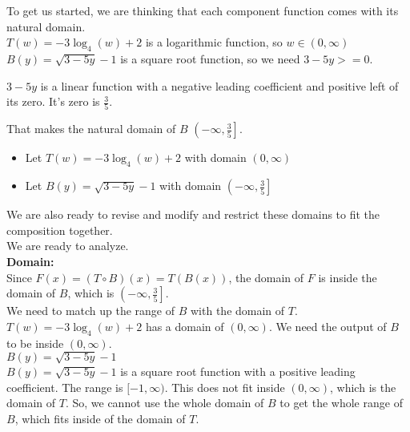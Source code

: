\documentclass{ximera}
\begin{document}
To get us started, we are thinking that each component function comes with its natural domain. \\


$T(w) = -3 \log_4(w) + 2$ is a logarithmic function, so $w \in (0, \infty)$ \\


$B(y) = \sqrt{3 - 5y} - 1$ is a square root function, so we need $3 - 5y >= 0$.

$3 - 5y$ is a linear function with a negative leading coefficient and positive left of its zero.  It's zero is $\frac{3}{5}$.

That makes the natural domain of $B$ $\left(-\infty, \frac{3}{5} \right]$. \\



\begin{itemize}
\item Let $T(w) = -3 \log_4(w) + 2$ with domain $(0, \infty)$\\
\item Let $B(y) = \sqrt{3 - 5y} - 1$ with domain $\left(-\infty, \frac{3}{5} \right]$\\
\end{itemize}

We are also ready to revise and modify and restrict these domains to fit the composition together. \\




We are ready to analyze. \\




\textbf{\textcolor{blue!55!black}{Domain:}} \\



Since $F(x) = (T \circ B)(x) = T(B(x))$, the domain of $F$ is inside the domain of $B$, which is $\left(-\infty, \frac{3}{5} \right]$. \\

We need to match up the range of $B$ with the domain of $T$. \\


$T(w) = -3 \log_4(w) + 2$ has a domain of $(0, \infty)$.  We need the output of $B$ to be inside $(0, \infty)$. \\



$B(y) = \sqrt{3 - 5y} - 1$ \\



$B(y) = \sqrt{3 - 5y} - 1$ is a square root function with a positive leading coefficient.  The range is $[-1, \infty)$.   This does not fit inside $(0, \infty)$, which is the domain of $T$.  So, we cannot use the whole domain of $B$ to get the whole range of $B$, which fits inside of the domain of $T$. \\
\end{document}
